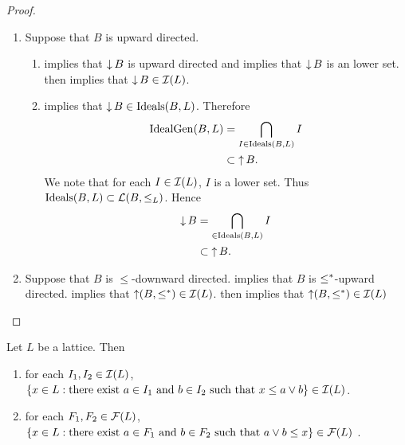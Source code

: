 \documentclass{book}
\begin{document}
	\begin{proof}\
		\begin{enumerate}
			\item Suppose that $B$ is upward directed. 
			\begin{enumerate}
				\item \rex{} implies that $\operatorname{\downarrow} B$ is upward directed and \rex{}  implies that $\operatorname{\downarrow} B$ is an lower set. \rex{} then implies that $\operatorname{\downarrow} B \in \mathcal{I}(L)$. 
				\item \tcr{The prev part} implies that $\operatorname{\downarrow} B \in \operatorname{Ideals}(B, L)$. Therefore
				\begin{align*}
					\operatorname{IdealGen}(B, L)
					& = \bigcap\limits_{I \in \operatorname{Ideals}(B, L)} I \\
					& \subset \operatorname{\uparrow} B.
				\end{align*}
				We note that for each $I \in \mathcal{I}(L)$, $I$ is a lower set. Thus $\operatorname{Ideals}(B, L) \subset \mathcal{L}(B, \leq_L)$. Hence 
				\begin{align*}
					\operatorname{\downarrow} B
					& = \bigcap\limits_{ \in \operatorname{Ideals}(B, L)} I \\
					& \subset \operatorname{\uparrow} B.
				\end{align*}
			\end{enumerate}
			\item Suppose that $B$ is $\leq$-downward directed. \rex{} implies that $B$ is $\leq^*$-upward directed.  implies that $\operatorname{\uparrow}(B, \leq^*) \in \mathcal{I}(L)$. \rex{} then implies that $\operatorname{\uparrow}(B, \leq^*) \in \mathcal{I}(L)$
			
		\end{enumerate}
	\end{proof}
	
	\begin{defn}
	\end{defn}
	
	
	\begin{ex}
		Let $L$ be a lattice. Then 
		\begin{enumerate}
			\item for each $I_1, I_2 \in \mathcal{I}(L)$, $\{x \in L: \text{there exist $a \in I_1$ and $b \in I_2$ such that $x \leq a \vee b$} \} \in \mathcal{I}(L)$.
			\item for each $F_1, F_2 \in \mathcal{F}(L)$, $\{x \in L: \text{there exist $a \in F_1$ and $b \in F_2$ such that $a \vee b \leq x$} \} \in \mathcal{F}(L)$ .
		\end{enumerate}
	\end{ex}
	
\end{document}
